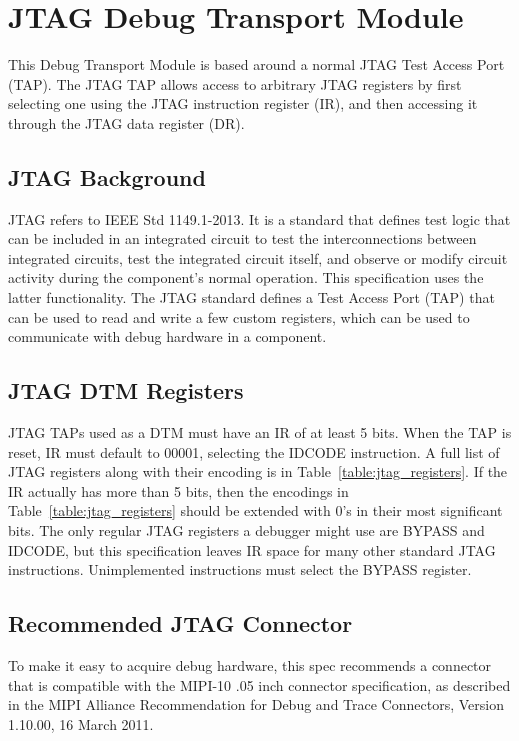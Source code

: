 \section{JTAG Debug Transport Module} \label{sec:jtagdtm}

This Debug Transport Module is based around a normal JTAG Test Access Port
(TAP).  The JTAG TAP allows access to arbitrary JTAG registers by first
selecting one using the JTAG instruction register (IR), and then accessing it
through the JTAG data register (DR).

\subsection{JTAG Background}

JTAG refers to IEEE Std 1149.1-2013. It is a standard that defines test logic
that can be included in an integrated circuit to test the interconnections
between integrated circuits, test the integrated circuit itself, and observe or
modify circuit activity during the component’s normal operation.
This specification uses the latter functionality.
The JTAG standard defines a Test Access Port (TAP) that
can be used to read and write a few custom registers, which can be used to
communicate with debug hardware in a component.

\subsection{JTAG DTM Registers}

JTAG TAPs used as a DTM must have an IR of at least 5 bits.
When the TAP is reset, IR must default to
00001, selecting the IDCODE instruction. A full list of JTAG registers along
with their encoding is in Table~\ref{table:jtag_registers}.
If the IR actually has more than 5 bits, then the encodings in
Table~\ref{table:jtag_registers} should be extended with 0's in their
most significant bits.
The only regular JTAG registers a debugger might use are BYPASS and IDCODE, but this
specification leaves IR space for many other standard JTAG instructions.
Unimplemented instructions must select the BYPASS register.



\subsection{Recommended JTAG Connector}

To make it easy to acquire debug hardware, this spec recommends a connector
that is compatible with the MIPI-10 .05 inch connector specification, as described
in the MIPI Alliance Recommendation for Debug and Trace Connectors, Version
1.10.00, 16 March 2011.

